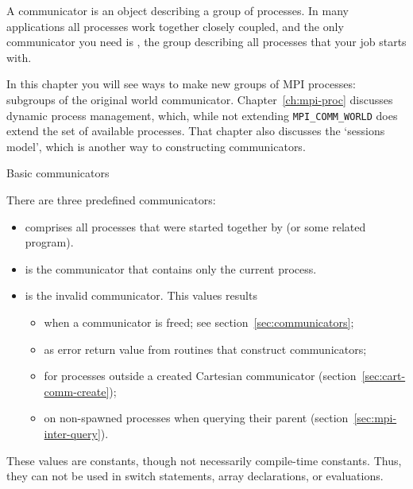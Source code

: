 
A communicator is an object describing a group of processes. In many 
applications all processes work together closely coupled, and the
only communicator you need is , the
group describing all processes that your job starts with.

In this chapter you will see ways to make new groups of MPI processes:
subgroups of the original world communicator.
Chapter~\ref{ch:mpi-proc} discusses dynamic process management, which, while
not extending \lstinline{MPI_COMM_WORLD} does extend the set of
available processes.
That chapter also discusses the `sessions model',
which is another way to constructing communicators.

 {Basic communicators}
\label{sec:comm-basic}

There are three predefined communicators:
\begin{itemize}
\item {} comprises all processes that were started 
  together by  (or some related program).
\item {} is the communicator that contains only
   the current process.
 \item {} is the invalid communicator.
   This values results
   \begin{itemize}
   \item when a communicator is freed; see section~\ref{sec:communicators};
   \item as error return value from routines that construct communicators;
   \item for processes outside a created Cartesian communicator
     (section~\ref{sec:cart-comm-create});
   \item on non-spawned processes when querying their parent
     (section~\ref{sec:mpi-inter-query}).
   \end{itemize}

\end{itemize}
These values are constants, though not necessarily compile-time constants.
Thus, they can not be used in switch statements, array declarations,
or  evaluations.

